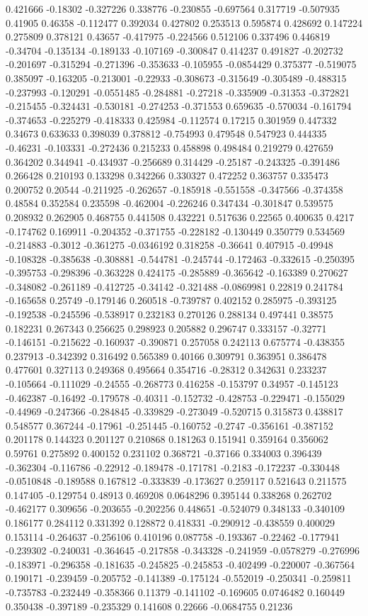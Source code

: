 0.421666 -0.18302 -0.327226 0.338776 -0.230855 -0.697564 0.317719 -0.507935 0.41905 0.46358 -0.112477 0.392034 0.427802 0.253513 0.595874 0.428692 0.147224 0.275809 0.378121 0.43657 -0.417975 -0.224566 0.512106 0.337496 0.446819 -0.34704 -0.135134 -0.189133 -0.107169 -0.300847 0.414237 0.491827 -0.202732 -0.201697 -0.315294 -0.271396 -0.353633 -0.105955 -0.0854429 0.375377 -0.519075 0.385097 -0.163205 -0.213001 -0.22933 -0.308673 -0.315649 -0.305489 -0.488315 -0.237993 -0.120291 -0.0551485 -0.284881 -0.27218 -0.335909 -0.31353 -0.372821 -0.215455 -0.324431 -0.530181 -0.274253 -0.371553 0.659635 -0.570034 -0.161794 -0.374653 -0.225279 -0.418333 0.425984 -0.112574 0.17215 0.301959 0.447332 0.34673 0.633633 0.398039 0.378812 -0.754993 0.479548 0.547923 0.444335 -0.46231 -0.103331 -0.272436 0.215233 0.458898 0.498484 0.219279 0.427659 0.364202 0.344941 -0.434937 -0.256689 0.314429 -0.25187 -0.243325 -0.391486 0.266428 0.210193 0.133298 0.342266 0.330327 0.472252 0.363757 0.335473 0.200752 0.20544 -0.211925 -0.262657 -0.185918 -0.551558 -0.347566 -0.374358 0.48584 0.352584 0.235598 -0.462004 -0.226246 0.347434 -0.301847 0.539575 0.208932 0.262905 0.468755 0.441508 0.432221 0.517636 0.22565 0.400635 0.4217 -0.174762 0.169911 -0.204352 -0.371755 -0.228182 -0.130449 0.350779 0.534569 -0.214883 -0.3012 -0.361275 -0.0346192 0.318258 -0.36641 0.407915 -0.49948 -0.108328 -0.385638 -0.308881 -0.544781 -0.245744 -0.172463 -0.332615 -0.250395 -0.395753 -0.298396 -0.363228 0.424175 -0.285889 -0.365642 -0.163389 0.270627 -0.348082 -0.261189 -0.412725 -0.34142 -0.321488 -0.0869981 0.22819 0.241784 -0.165658 0.25749 -0.179146 0.260518 -0.739787 0.402152 0.285975 -0.393125 -0.192538 -0.245596 -0.538917 0.232183 0.270126 0.288134 0.497441 0.38575 0.182231 0.267343 0.256625 0.298923 0.205882 0.296747 0.333157 -0.32771 -0.146151 -0.215622 -0.160937 -0.390871 0.257058 0.242113 0.675774 -0.438355 0.237913 -0.342392 0.316492 0.565389 0.40166 0.309791 0.363951 0.386478 0.477601 0.327113 0.249368 0.495664 0.354716 -0.28312 0.342631 0.233237 -0.105664 -0.111029 -0.24555 -0.268773 0.416258 -0.153797 0.34957 -0.145123 -0.462387 -0.16492 -0.179578 -0.40311 -0.152732 -0.428753 -0.229471 -0.155029 -0.44969 -0.247366 -0.284845 -0.339829 -0.273049 -0.520715 0.315873 0.438817 0.548577 0.367244 -0.17961 -0.251445 -0.160752 -0.2747 -0.356161 -0.387152 0.201178 0.144323 0.201127 0.210868 0.181263 0.151941 0.359164 0.356062 0.59761 0.275892 0.400152 0.231102 0.368721 -0.37166 0.334003 0.396439 -0.362304 -0.116786 -0.22912 -0.189478 -0.171781 -0.2183 -0.172237 -0.330448 -0.0510848 -0.189588 0.167812 -0.333839 -0.173627 0.259117 0.521643 0.211575 0.147405 -0.129754 0.48913 0.469208 0.0648296 0.395144 0.338268 0.262702 -0.462177 0.309656 -0.203655 -0.202256 0.448651 -0.524079 0.348133 -0.340109 0.186177 0.284112 0.331392 0.128872 0.418331 -0.290912 -0.438559 0.400029 0.153114 -0.264637 -0.256106 0.410196 0.087758 -0.193367 -0.22462 -0.177941 -0.239302 -0.240031 -0.364645 -0.217858 -0.343328 -0.241959 -0.0578279 -0.276996 -0.183971 -0.296358 -0.181635 -0.245825 -0.245853 -0.402499 -0.220007 -0.367564 0.190171 -0.239459 -0.205752 -0.141389 -0.175124 -0.552019 -0.250341 -0.259811 -0.735783 -0.232449 -0.358366 0.11379 -0.141102 -0.169605 0.0746482 0.160449 0.350438 -0.397189 -0.235329 0.141608 0.22666 -0.0684755 0.21236 